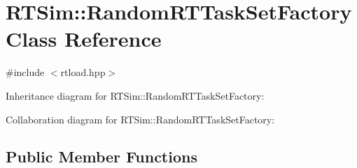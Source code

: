 \hypertarget{classRTSim_1_1RandomRTTaskSetFactory}{}\section{R\+T\+Sim\+:\+:Random\+R\+T\+Task\+Set\+Factory Class Reference}
\label{classRTSim_1_1RandomRTTaskSetFactory}


{\ttfamily \#include $<$rtload.\+hpp$>$}



Inheritance diagram for R\+T\+Sim\+:\+:Random\+R\+T\+Task\+Set\+Factory\+:


Collaboration diagram for R\+T\+Sim\+:\+:Random\+R\+T\+Task\+Set\+Factory\+:
\subsection*{Public Member Functions}

